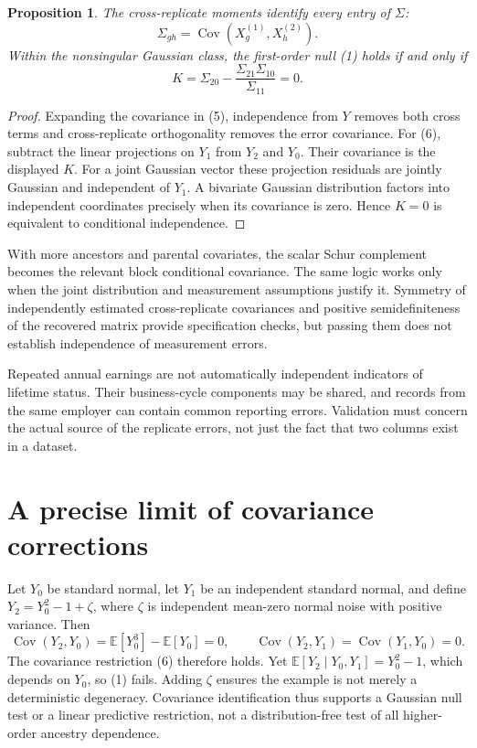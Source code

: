 \documentclass[11pt,a4paper]{article}
\newtheorem{proposition}[theorem]{Proposition}
\newcommand{\E}{\mathbb E}
\DeclareMathOperator{\Cov}{Cov}
\begin{document}
\begin{proposition}
The cross-replicate moments identify every entry of $\Sigma$:
\[
 \Sigma_{gh}=\Cov(X_g^{(1)},X_h^{(2)}).
 \tag{5}
\]
Within the nonsingular Gaussian class, the first-order null (1) holds if and only if
\[
 K=\Sigma_{20}-\frac{\Sigma_{21}\Sigma_{10}}{\Sigma_{11}}=0.
 \tag{6}
\]
\end{proposition}
\begin{proof}
Expanding the covariance in (5), independence from $Y$ removes both cross terms and cross-replicate orthogonality removes the error covariance. For (6), subtract the linear projections on $Y_1$ from $Y_2$ and $Y_0$. Their covariance is the displayed $K$. For a joint Gaussian vector these projection residuals are jointly Gaussian and independent of $Y_1$. A bivariate Gaussian distribution factors into independent coordinates precisely when its covariance is zero. Hence $K=0$ is equivalent to conditional independence.
\end{proof}
With more ancestors and parental covariates, the scalar Schur complement becomes the relevant block conditional covariance. The same logic works only when the joint distribution and measurement assumptions justify it. Symmetry of independently estimated cross-replicate covariances and positive semidefiniteness of the recovered matrix provide specification checks, but passing them does not establish independence of measurement errors.

Repeated annual earnings are not automatically independent indicators of lifetime status. Their business-cycle components may be shared, and records from the same employer can contain common reporting errors. Validation must concern the actual source of the replicate errors, not just the fact that two columns exist in a dataset.
\section{A precise limit of covariance corrections}
Let $Y_0$ be standard normal, let $Y_1$ be an independent standard normal, and define $Y_2=Y_0^2-1+\zeta$, where $\zeta$ is independent mean-zero normal noise with positive variance. Then
\[
 \Cov(Y_2,Y_0)=\E[Y_0^3]-\E[Y_0]=0,
 \qquad \Cov(Y_2,Y_1)=\Cov(Y_1,Y_0)=0.
\]
The covariance restriction (6) therefore holds. Yet
$\E[Y_2\mid Y_0,Y_1]=Y_0^2-1$, which depends on $Y_0$, so (1) fails. Adding $\zeta$ ensures the example is not merely a deterministic degeneracy. Covariance identification thus supports a Gaussian null test or a linear predictive restriction, not a distribution-free test of all higher-order ancestry dependence.
\end{document}
